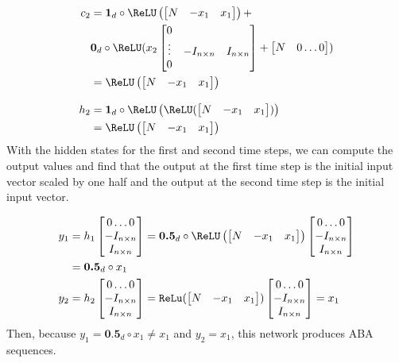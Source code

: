 \begin{align*}
  c_2 &= \textbf{1}_d \circ \ReLU \left( \begin{bmatrix} N & -x_1 & x_1 \end{bmatrix}\right) +\\
      & \textbf{0}_d\circ \ReLU(x_2\begin{bmatrix} 0 &  & \\ \vdots & -I_{n \times n} & I_{n \times n}\\ 0 & &  \end{bmatrix} + \begin{bmatrix} N & 0 \dots 0\end{bmatrix}) \\
      &= \ReLU \left( \begin{bmatrix} N & -x_1 & x_1 \end{bmatrix}\right) \\[2ex]
  h_2 &= \textbf{1}_d \circ \ReLU\left(\ReLU ( \begin{bmatrix} N & -x_1 & x_1 \end{bmatrix})\right) \\
      &= \ReLU \left( \begin{bmatrix} N & -x_1 & x_1 \end{bmatrix}\right)
\end{align*}
%
With the hidden states for the first and second time steps, we can compute the output values and find that the output at the first time step is the initial input vector scaled by one half and the output at the second time step is the initial input vector.

\begin{align*}
  y_1 &= h_1\begin{bmatrix} 0 \dots 0 \\ -I_{n \times n} \\ I_{n \times n}  \end{bmatrix} = \textbf{0.5}_d\circ \ReLU\left( \begin{bmatrix} N & -x_1 & x_1 \end{bmatrix}\right) \begin{bmatrix} 0 \dots 0 \\ -I_{n \times n} \\ I_{n \times n}  \end{bmatrix} \\
      &= \textbf{0.5}_d\circ x_1\\
  y_2 &= h_2\begin{bmatrix} 0 \dots 0 \\ -I_{n \times n} \\ I_{n \times n}  \end{bmatrix} = \texttt{ReLu} ( \begin{bmatrix} N & -x_1 & x_1 \end{bmatrix}) \begin{bmatrix} 0 \dots 0 \\ -I_{n \times n} \\ I_{n \times n}  \end{bmatrix} = x_1
\end{align*}
%
Then, because $y_1 = \textbf{0.5}_d\circ x_1 \not = x_1$ and $y_2 = x_1$, this network produces ABA sequences.




